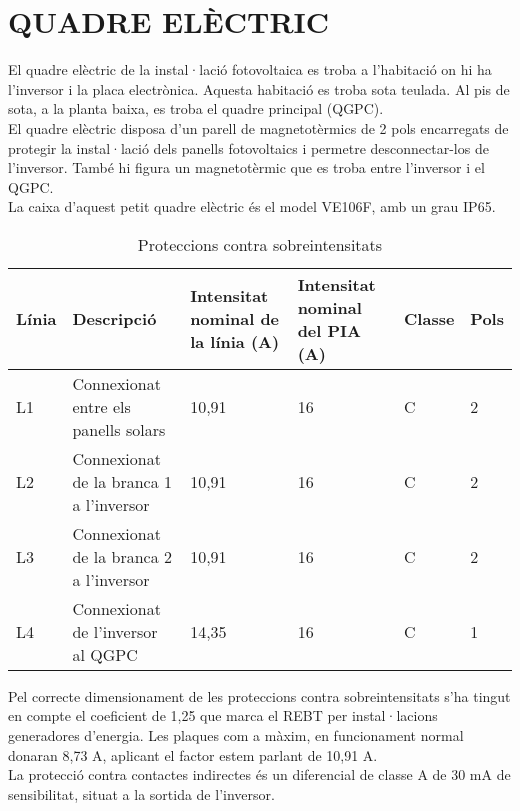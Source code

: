 \chapter{\uppercase{Quadre elèctric}}
El quadre elèctric de la instal·lació fotovoltaica es troba a l'habitació on hi ha l'inversor i la placa electrònica. Aquesta habitació es troba sota teulada. Al pis de sota, a la planta baixa, es troba el quadre principal (QGPC).\\
\newline El quadre elèctric disposa d'un parell de magnetotèrmics de 2 pols encarregats de protegir la instal·lació dels panells fotovoltaics i permetre desconnectar-los de l'inversor. També hi figura un magnetotèrmic que es troba entre l'inversor i el QGPC.\\
\newline La caixa d'aquest petit quadre elèctric és el model VE106F, amb un grau IP65.

%
%
%

\begin{table}[H]
\small
\begin{center}
 \begin{tabu} to \textwidth {|X[0.4, l]|X[2, l]|X[0.8, r]|X[0.7 , r]|X[0.4 , r]|X[0.4 , r]|}%
 \hline
 Línia & Descripció & Intensitat nominal de la línia (A) & Intensitat nominal del PIA (A) & Classe & Pols\\
 \hline \hline 

L1 & Connexionat entre els panells solars &  10,91 & 16 & C & 2 \\ \hline
L2 & Connexionat de la branca 1 a l'inversor & 10,91 & 16 & C & 2 \\ \hline 
L3 & Connexionat de la branca 2 a l'inversor  & 10,91 & 16 & C & 2 \\ \hline 
L4 & Connexionat de l'inversor al QGPC  & 14,35 & 16 & C & 1 \\ \hline

 \end{tabu}
 \caption{Proteccions contra sobreintensitats}
\end{center}
\end{table}


\noindent Pel correcte dimensionament de les proteccions contra sobreintensitats s'ha tingut en compte el coeficient de 1,25 que marca el REBT per instal·lacions generadores d'energia. Les plaques com a màxim, en funcionament normal donaran 8,73 A, aplicant el factor estem parlant de 10,91 A.\\
\newline La protecció contra contactes indirectes és un diferencial de classe A de 30 mA de sensibilitat, situat a la sortida de l'inversor.
%


